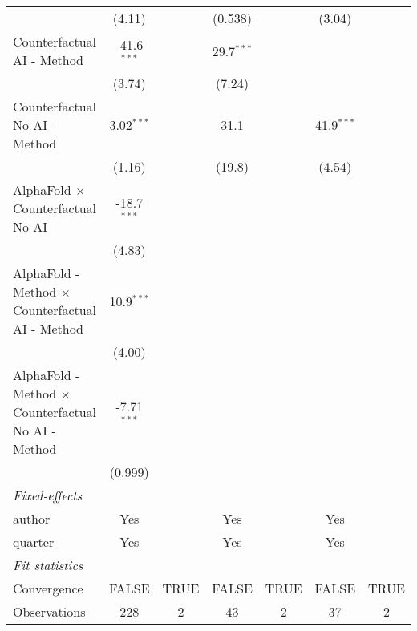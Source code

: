 \begin{tabular}{lcccccc}
                                                              & (4.11)        &      & (0.538)       &      & (3.04)        &   \\   
   Counterfactual AI - Method                                 & -41.6$^{***}$ &      & 29.7$^{***}$  &      &               &   \\   
                                                              & (3.74)        &      & (7.24)        &      &               &   \\   
   Counterfactual No AI - Method                              & 3.02$^{***}$  &      & 31.1          &      & 41.9$^{***}$  &   \\   
                                                              & (1.16)        &      & (19.8)        &      & (4.54)        &   \\   
   AlphaFold $\times$ Counterfactual No AI                    & -18.7$^{***}$ &      &               &      &               &   \\   
                                                              & (4.83)        &      &               &      &               &   \\   
   AlphaFold - Method $\times$ Counterfactual AI - Method     & 10.9$^{***}$  &      &               &      &               &   \\   
                                                              & (4.00)        &      &               &      &               &   \\   
   AlphaFold - Method $\times$ Counterfactual No AI - Method  & -7.71$^{***}$ &      &               &      &               &   \\   
                                                              & (0.999)       &      &               &      &               &   \\   
   \midrule
   \emph{Fixed-effects}\\
   author                                                     & Yes           &      & Yes           &      & Yes           & \\  
   quarter                                                    & Yes           &      & Yes           &      & Yes           & \\  
   \midrule
   \emph{Fit statistics}\\
   Convergence                                                &FALSE          & TRUE & FALSE         & TRUE & FALSE         & TRUE\\  
   Observations                                               & 228           & 2    & 43            & 2    & 37            & 2\\  

\end{tabular}
